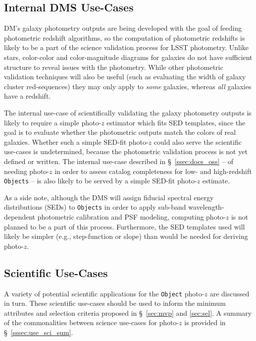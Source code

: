 \documentclass[DM,lsstdraft,toc]{lsstdoc}
\begin{document}
\subsection{Internal DMS Use-Cases}\label{ssec:use_dm}

DM's galaxy photometry outputs are being developed with the goal of feeding photometric redshift algorithms, so the computation of photometric redshifts is likely to be a part of the science validation process for LSST photometry. 
Unlike stars, color-color and color-magnitude diagrams for galaxies do not have sufficient structure to reveal issues with the photometry.
While other photometric validation techniques will also be useful (such as evaluating the width of galaxy cluster red-sequences) they may only apply to {\it some} galaxies, whereas {\it all} galaxies have a redshift. 

The internal use-case of scientifically validating the galaxy photometry outputs is likely to require a simple photo-$z$ estimator which fits SED templates, since the goal is to evaluate whether the photometric outputs match the colors of real galaxies.
Whether such a simple SED-fit photo-$z$ could also serve the scientific use-cases is undetermined, because the photometric validation process is not yet defined or written.
The internal use-case described in \S~\ref{ssec:docs_oss} -- of needing photo-$z$ in order to assess catalog completeness for low- and high-redshift {\tt Objects} -- is also likely to be served by a simple SED-fit photo-$z$ estimate.

As a side note, although the DMS will assign fiducial spectral energy distributions (SEDs) to {\tt Objects} in order to apply sub-band wavelength-dependent photometric calibration and PSF modeling, computing photo-$z$ is not planned to be a part of this process.
Furthermore, the SED templates used will likely be simpler (e.g., step-function or slope) than would be needed for deriving photo-$z$.

\subsection{Scientific Use-Cases}\label{ssec:use_sci}

A variety of potential scientific applications for the {\tt Object} photo-$z$ are discussed in turn. 
These scientific use-cases should be used to inform the minimum attributes and selection criteria proposed in \S~\ref{sec:mvp} and \ref{sec:sel}.
A summary of the commonalities between science use-cases for photo-$z$ is provided in \S~\ref{sssec:use_sci_sum}.
\end{document}
